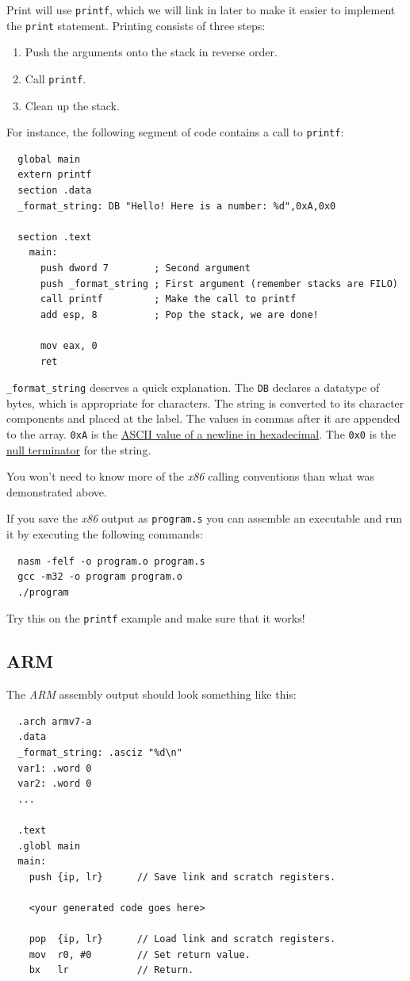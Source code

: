 \documentclass{article}
\newcommand{\code}[1]{\texttt{\textmd{#1}}}
\begin{document}
Print will use \code{printf}, which we will link in later to make it easier to implement the
\code{print} statement. Printing consists of three steps:
\begin{enumerate}
  \item Push the arguments onto the stack in reverse order.
  \item Call \code{printf}.
  \item Clean up the stack.
\end{enumerate}

For instance, the following segment of code contains a call to \code{printf}:
\begin{lstlisting}
  global main
  extern printf
  section .data
  _format_string: DB "Hello! Here is a number: %d",0xA,0x0

  section .text
    main:
      push dword 7        ; Second argument
      push _format_string ; First argument (remember stacks are FILO)
      call printf         ; Make the call to printf
      add esp, 8          ; Pop the stack, we are done!

      mov eax, 0
      ret
\end{lstlisting}

\code{\_format\_string} deserves a quick explanation. The \code{DB} declares a datatype of bytes,
which is appropriate for characters. The string is converted to its character components and
placed at the label. The values in commas after it are appended to the array. \code{0xA} is the
\href{http://www.asciitable.com/}{ASCII value of a newline in hexadecimal}. The \code{0x0} is the
\href{https://en.wikipedia.org/wiki/Null-terminated_string}{null terminator} for the string.

You won't need to know more of the \textit{x86} calling conventions than what was demonstrated
above.

If you save the \textit{x86} output as \code{program.s} you can assemble an executable and run it
by executing the following commands:
\begin{lstlisting}
  nasm -felf -o program.o program.s
  gcc -m32 -o program program.o
  ./program
\end{lstlisting}

Try this on the \code{printf} example and make sure that it works!

\subsection{ARM}
The \textit{ARM} assembly output should look something like this:
\begin{lstlisting}
  .arch armv7-a
  .data
  _format_string: .asciz "%d\n"
  var1: .word 0
  var2: .word 0
  ...

  .text
  .globl main
  main:
    push {ip, lr}      // Save link and scratch registers.

    <your generated code goes here>

    pop  {ip, lr}      // Load link and scratch registers.
    mov  r0, #0        // Set return value.
    bx   lr            // Return.
\end{lstlisting}
\end{document}

